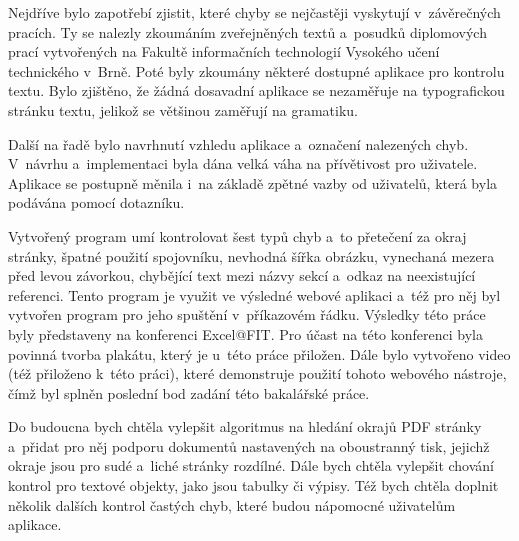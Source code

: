 Nejdříve bylo zapotřebí zjistit, které chyby se nejčastěji vyskytují v~závěrečných
pracích. Ty se nalezly zkoumáním zveřejněných textů a~posudků diplomových prací
vytvořených na Fakultě informačních technologií Vysokého učení technického v~Brně.
Poté byly zkoumány některé dostupné aplikace pro kontrolu textu. Bylo zjištěno,
že žádná dosavadní aplikace se nezaměřuje na typografickou stránku textu, jelikož
se většinou zaměřují na gramatiku.

Další na řadě bylo navrhnutí vzhledu aplikace a~označení nalezených chyb.
V~návrhu a~implementaci byla dána velká váha na přívětivost pro uživatele.
Aplikace se postupně měnila i~na základě zpětné vazby od uživatelů, která byla
podávána pomocí dotazníku.

Vytvořený program umí kontrolovat šest typů chyb a~to přetečení za okraj stránky, 
špatné použití spojovníku, nevhodná šířka obrázku, vynechaná mezera před levou
závorkou, chybějící text mezi názvy sekcí a~odkaz na neexistující referenci.
Tento program je využit ve výsledné webové aplikaci a~též pro něj byl 
vytvořen program pro jeho spuštění v~příkazovém řádku.
Výsledky této práce byly představeny na konferenci Excel@FIT. Pro
účast na této konferenci byla povinná tvorba plakátu, který je u~této
práce přiložen.
Dále bylo vytvořeno video (též přiloženo k~této práci), které
demonstruje použití tohoto webového nástroje, čímž byl splněn poslední bod
zadání této bakalářské práce.

Do budoucna bych chtěla vylepšit algoritmus na hledání okrajů PDF stránky
a~přidat pro něj podporu dokumentů nastavených na oboustranný tisk, jejichž
okraje jsou pro sudé a~liché stránky rozdílné. Dále bych chtěla vylepšit chování
kontrol pro textové objekty, jako jsou tabulky či výpisy. Též bych chtěla doplnit
několik dalších kontrol častých chyb, které budou nápomocné uživatelům aplikace.






%
